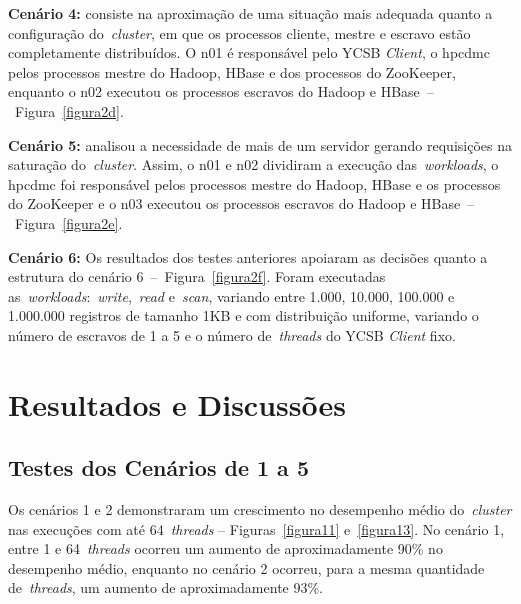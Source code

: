 \documentclass[12pt]{article}
\begin{document}
\textbf{Cenário 4:} consiste na aproximação de uma situação mais adequada quanto a configuração do~\emph{cluster}, em que os processos cliente, mestre e escravo estão completamente distribuídos. 
O n01 é responsável pelo YCSB \textit{Client}, o hpcdmc pelos processos mestre do Hadoop, HBase e dos processos do ZooKeeper, enquanto o n02 executou os processos escravos do Hadoop e HBase~--~Figura~\ref{figura2d}.

\textbf{Cenário 5:} analisou a necessidade de mais de um servidor gerando requisições na saturação do~\emph{cluster}. 
Assim, o n01 e n02 dividiram a execução das~\emph{workloads}, o hpcdmc foi responsável pelos processos mestre do Hadoop, HBase e os processos do ZooKeeper e o n03 executou os processos escravos do Hadoop e HBase~--~Figura~\ref{figura2e}.

\textbf{Cenário 6:} Os resultados dos testes anteriores apoiaram as decisões quanto a estrutura do cenário 6~--~Figura~\ref{figura2f}. Foram executadas as~\emph{workloads}:~\emph{write},~\emph{read} e~\emph{scan}, variando entre 1.000, 10.000, 100.000 e 1.000.000 registros de tamanho 1KB e com distribuição uniforme, variando o número de escravos de 1 a 5 e o número de~\emph{threads} do YCSB \textit{Client} fixo.

\section{Resultados e Discussões}
\label{sec:resultados}

\subsection{Testes dos Cenários de 1 a 5}

Os cenários 1 e 2 demonstraram um crescimento no desempenho médio do~\emph{cluster} nas execuções com até 64~\emph{threads} -- Figuras~\ref{figura11} e~\ref{figura13}. 
No cenário 1, entre 1 e 64~\emph{threads} ocorreu um aumento de aproximadamente 90\% no desempenho médio, enquanto no cenário 2 ocorreu, para a mesma quantidade de~\emph{threads}, um aumento de aproximadamente 93\%.
\end{document}
